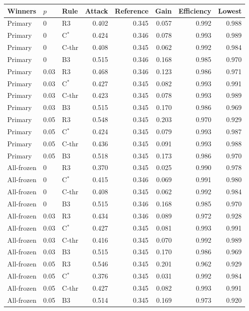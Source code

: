 \begin{tabular}{lllrrrrr}
\toprule
Winners & $p$ & Rule & Attack & Reference & Gain & Efficiency & Lowest \\
\midrule
Primary & 0 & R3 & 0.402 & 0.345 & 0.057 & 0.992 & 0.988 \\
Primary & 0 & C$^*$ & 0.424 & 0.346 & 0.078 & 0.993 & 0.989 \\
Primary & 0 & C-thr & 0.408 & 0.345 & 0.062 & 0.992 & 0.984 \\
Primary & 0 & B3 & 0.515 & 0.346 & 0.168 & 0.985 & 0.970 \\
Primary & 0.03 & R3 & 0.468 & 0.346 & 0.123 & 0.986 & 0.971 \\
Primary & 0.03 & C$^*$ & 0.427 & 0.345 & 0.082 & 0.993 & 0.991 \\
Primary & 0.03 & C-thr & 0.423 & 0.345 & 0.078 & 0.993 & 0.989 \\
Primary & 0.03 & B3 & 0.515 & 0.345 & 0.170 & 0.986 & 0.969 \\
Primary & 0.05 & R3 & 0.548 & 0.345 & 0.203 & 0.970 & 0.929 \\
Primary & 0.05 & C$^*$ & 0.424 & 0.345 & 0.079 & 0.993 & 0.987 \\
Primary & 0.05 & C-thr & 0.436 & 0.345 & 0.091 & 0.993 & 0.988 \\
Primary & 0.05 & B3 & 0.518 & 0.345 & 0.173 & 0.986 & 0.970 \\
All-frozen & 0 & R3 & 0.370 & 0.345 & 0.025 & 0.990 & 0.978 \\
All-frozen & 0 & C$^*$ & 0.415 & 0.346 & 0.069 & 0.991 & 0.980 \\
All-frozen & 0 & C-thr & 0.408 & 0.345 & 0.062 & 0.992 & 0.984 \\
All-frozen & 0 & B3 & 0.515 & 0.346 & 0.168 & 0.985 & 0.970 \\
All-frozen & 0.03 & R3 & 0.434 & 0.346 & 0.089 & 0.972 & 0.928 \\
All-frozen & 0.03 & C$^*$ & 0.427 & 0.345 & 0.081 & 0.993 & 0.991 \\
All-frozen & 0.03 & C-thr & 0.416 & 0.345 & 0.070 & 0.992 & 0.989 \\
All-frozen & 0.03 & B3 & 0.515 & 0.345 & 0.170 & 0.986 & 0.969 \\
All-frozen & 0.05 & R3 & 0.546 & 0.345 & 0.201 & 0.962 & 0.929 \\
All-frozen & 0.05 & C$^*$ & 0.376 & 0.345 & 0.031 & 0.992 & 0.984 \\
All-frozen & 0.05 & C-thr & 0.427 & 0.345 & 0.082 & 0.993 & 0.991 \\
All-frozen & 0.05 & B3 & 0.514 & 0.345 & 0.169 & 0.973 & 0.920 \\
\bottomrule
\end{tabular}
